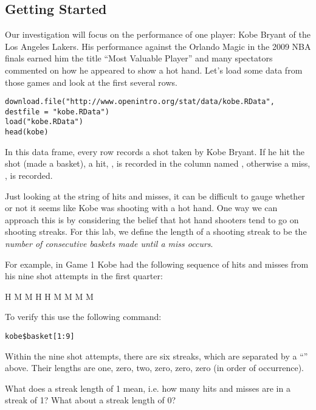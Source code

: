 \documentclass[11pt]{article}
\begin{document}
\subsection*{Getting Started}
Our investigation will focus on the performance of one player: Kobe Bryant of the Los Angeles Lakers.  His performance against the Orlando Magic in the 2009 NBA finals earned him the title ``Most Valuable Player'' and many spectators commented on how he appeared to show a hot hand.  Let's load some data from those games and look at the first several rows.

\begin{lstlisting}
download.file("http://www.openintro.org/stat/data/kobe.RData", destfile = "kobe.RData")
load("kobe.RData")
head(kobe)
\end{lstlisting}


In this data frame, every row records a shot taken by Kobe Bryant.  If he hit the shot (made a basket), a hit, , is recorded in the column named , otherwise a miss, , is recorded.

Just looking at the string of hits and misses, it can be difficult to gauge whether or not it seems like Kobe was shooting with a hot hand.  One way we can approach this is by considering the belief that hot hand shooters tend to go on shooting streaks.  For this lab, we define the length of a shooting streak to be the \emph{number of consecutive baskets made until a miss occurs}.

For example, in Game 1 Kobe had the following sequence of hits and misses from his nine shot attempts in the first quarter:

\begin{center}
 H  \quad M \quad \textbar \quad M \quad \textbar \quad H \quad  H \quad M \quad \textbar \quad M \quad \textbar \quad M \quad \textbar \quad M
\end{center}

To verify this use the following command:

\begin{lstlisting}
kobe$basket[1:9]
\end{lstlisting}


Within the nine shot attempts, there are six streaks, which are separated by a ``\textbar'' above. Their lengths are one, zero, two, zero, zero, zero (in order of occurrence).

\begin{exercise}
What does a streak length of 1 mean, i.e. how many hits and misses are in a streak of 1? What about a streak length of 0?
\end{exercise}
\end{document}
